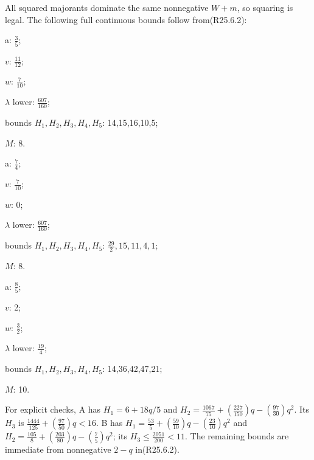 All squared majorants dominate the same nonnegative \(W+m\), so squaring is legal. The following full continuous bounds follow from(R25.6.2):

\begin{description}[style=nextline,leftmargin=1.6em,before=\raggedright]
\item[{A}] a: \(\frac{3}{5}\);\par\noindent \(v\): \(\frac{11}{12}\);\par\noindent \(w\): \(\frac{7}{10}\);\par\noindent \(\lambda\) lower: \(\frac{607}{160}\);\par\noindent bounds \(H_{1},\allowbreak \allowbreak H_{2},\allowbreak \allowbreak H_{3},\allowbreak \allowbreak H_{4},\allowbreak \allowbreak H_{5}\): 14,15,16,10,5;\par\noindent \(M\): 8.
\item[{B}] a: \(\frac{7}{4}\);\par\noindent \(v\): \(\frac{7}{10}\);\par\noindent \(w\): 0;\par\noindent \(\lambda\) lower: \(\frac{607}{160}\);\par\noindent bounds \(H_{1},\allowbreak \allowbreak H_{2},\allowbreak \allowbreak H_{3},\allowbreak \allowbreak H_{4},\allowbreak \allowbreak H_{5}\): \(\frac{29}{2},\allowbreak \allowbreak 15,\allowbreak \allowbreak 11,\allowbreak \allowbreak 4,\allowbreak \allowbreak 1\);\par\noindent \(M\): 8.
\item[{C}] a: \(\frac{8}{5}\);\par\noindent \(v\): 2;\par\noindent \(w\): \(\frac{3}{2}\);\par\noindent \(\lambda\) lower: \(\frac{19}{4}\);\par\noindent bounds \(H_{1},\allowbreak \allowbreak H_{2},\allowbreak \allowbreak H_{3},\allowbreak \allowbreak H_{4},\allowbreak \allowbreak H_{5}\): 14,36,42,47,21;\par\noindent \(M\): 10.
\end{description}

For explicit checks, A has \(H_{1}=6+18q/5\) and \(H_{2}=\frac{1067}{75}+(\frac{227}{150})q-(\frac{97}{30})q^2\). Its \(H_{3}\) is \(\frac{1444}{125}+(\frac{97}{50})q<16\). B has \(H_{1}=\frac{53}{5}+(\frac{59}{10})q-(\frac{23}{10})q^2\) and \(H_{2}=\frac{105}{8}+(\frac{203}{80})q-(\frac{7}{5})q^2\); its \(H_{3}\le \frac{2051}{200}<11\). The remaining bounds are immediate from nonnegative \(2-q\) in(R25.6.2).

